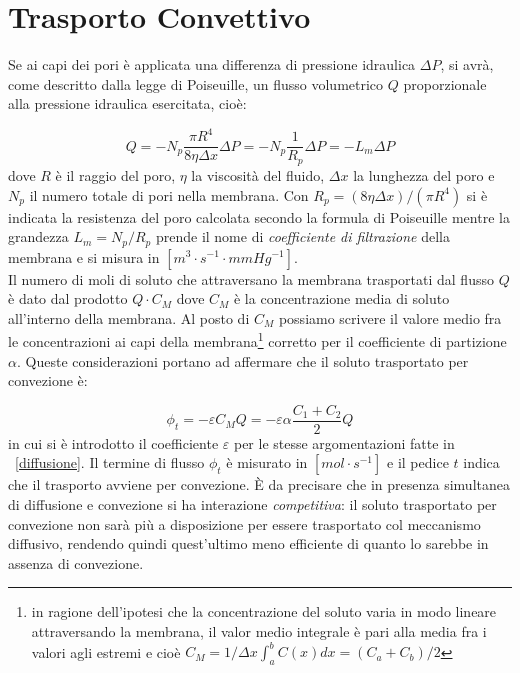 \section{Trasporto Convettivo}\label{sec:convettivo}
Se ai capi dei pori è applicata una differenza di pressione idraulica $\Delta P$, si avrà, come descritto dalla legge di Poiseuille, un flusso volumetrico $Q$ proporzionale alla pressione idraulica esercitata, cioè:

\begin{equation}\label{Qt}
	Q = -N_p\frac{\pi R^4}{8 \eta \Delta x}\Delta P = -N_p \frac{1}{R_p} \Delta P = - L_m \Delta P
\end{equation}
\noindent
\newline
dove $R$ è il raggio del poro, $\eta$ la viscosità del fluido, $\Delta x$ la lunghezza del poro e $N_p$ il numero totale di pori nella membrana. Con $R_p = (8\eta \Delta x)/(\pi R^4)$ si è indicata la resistenza del poro calcolata secondo la formula di Poiseuille mentre la grandezza $L_m = N_p / R_p$ prende il nome di \textit{coefficiente  di filtrazione} della membrana e si misura in $[m^3 \cdot s^{-1} \cdot mmHg^{-1}]$.\\
Il numero di moli di soluto che attraversano la membrana trasportati dal flusso $Q$ è dato dal prodotto $Q\cdot C_M$ dove $C_M$ è la concentrazione media di soluto all'interno della membrana. Al posto di $C_M$ possiamo scrivere il valore medio fra le concentrazioni ai capi della membrana\footnote{in ragione dell'ipotesi che la concentrazione del soluto varia in modo lineare attraversando la membrana, il valor medio integrale è pari alla media fra i valori agli estremi e cioè $C_M = 1/\Delta x \int_a^b{C(x)dx} = (C_a+C_b)/2$} corretto per il coefficiente di partizione $\alpha$.  Queste considerazioni portano ad affermare che il soluto trasportato per convezione è:

\begin{equation}\label{phiT}
	\phi_t = - \varepsilon C_M Q = - \varepsilon \alpha \frac{C_1 + C_2}{2} Q
\end{equation}
\noindent
\newline
in cui si è introdotto il coefficiente $\varepsilon$ per le stesse argomentazioni fatte in \textsection~\ref{diffusione}. Il termine di flusso $\phi_t$ è misurato in $[mol \cdot s^{-1}]$ e il pedice $t$ indica che il trasporto avviene per convezione.
È da precisare che in presenza simultanea di diffusione e convezione si ha interazione \textit{competitiva}: il soluto trasportato per convezione non sarà più a disposizione per essere trasportato col meccanismo diffusivo, rendendo quindi quest'ultimo meno efficiente di quanto lo sarebbe in assenza di convezione. 